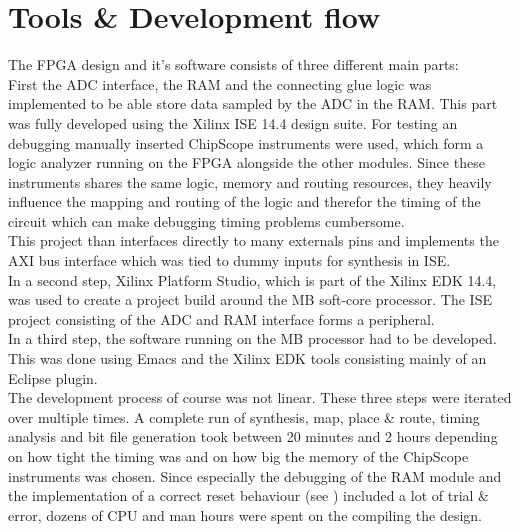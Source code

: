 \section{Tools \& Development flow}
\label{sec:fpga_tools}

The \gls{FPGA} design and it's software consists of three different
main parts: \\

First the \gls{ADC} interface, the \gls{RAM} and the connecting
glue logic was implemented to be able store data sampled by the \gls{ADC}
in the \gls{RAM}. This part was fully developed using the Xilinx ISE 14.4
design suite. For testing an debugging manually inserted ChipScope
instruments were used, which form a logic analyzer running on the \gls{FPGA}
alongside the other modules. Since these instruments shares the same logic,
memory and routing resources, they heavily influence the mapping and routing
of the logic and therefor the timing of the circuit which can make debugging
timing problems cumbersome. \\
This project than interfaces directly to many externals pins and implements
the \gls{AXI} bus interface which was tied to dummy inputs for synthesis in ISE.
\\

In a second step, Xilinx Platform Studio, which is part of the Xilinx
\gls{EDK} 14.4, was used to create a project build around the \acrfull{MB}
soft-core processor. The ISE project consisting of the \gls{ADC} and \gls{RAM}
interface forms a peripheral. \\

In a third step, the software running on the \gls{MB} processor had to be
developed. This was done using Emacs and the Xilinx \gls{EDK} tools
consisting mainly of an Eclipse plugin. \\

The development process of course was not linear. These three steps were
iterated over multiple times. A complete run of synthesis, map,
place \& route, timing analysis and bit file generation
took between 20 minutes and 2 hours depending on how tight the timing was
and on how big the memory of the ChipScope instruments was chosen.
Since especially the debugging of the \gls{RAM} module and the implementation of
a correct reset behaviour (see ) included a lot of
trial \& error, dozens of \gls{CPU} and man hours were spent on the
compiling the design.

